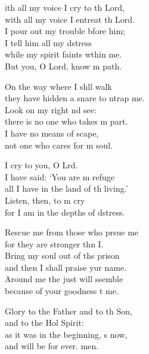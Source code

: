 \begin{psalmverse}%
\begin{patverse}
ith all my voice I cry to th Lord,\Med\\
    with all my voice I entreat th Lord.\\
I pour out my trouble bfore him;\Med\\
    I tell him all my d\pointup{\i}stress\\
while my spirit faints w\pointup{\i}thin me.\Med\\
    But you, O Lord, know m path.

On the way where I shll walk\Med\\
    they have hidden a snare to ntrap me.\\
Look on my right nd see:\Med\\
    there is no one who takes m part.\\
I have no means of scape,\Med\\
    not one who cares for m soul.

I cry to you, O Lrd.\Flex\\
    I have said: ‘You are m refuge\Med\\
    all I have in the land of th living.’\\
Listen, then, to m cry\Med\\
    for I am in the depths of d\pointup{\i}stress.

Rescue me from those who prsue me\Med\\
    for they are stronger thn I.\\
Bring my soul out of th\pointup{\i}s prison\Med\\
    and then I shall praise yur name.\\
Around me the just will ssemble\Med\\
    because of your goodness t me.

Glory to the Father and to th Son,\Med\\
    and to the Hol Spirit:\\
as it was in the beginning, \pointup{\i}s now,\Med\\
    and will be for ever. men.
\end{patverse}
\end{psalmverse}
